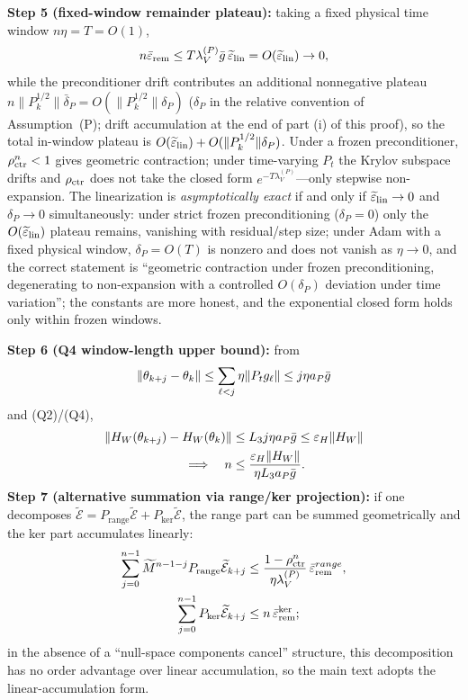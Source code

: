 \documentclass[11pt]{article}
\DeclarePairedDelimiter{\norm}{\lVert}{\rVert}
\newcommand{\W}{W}
\newcommand{\Erem}{\mathcal E}
\newcommand{\wt}[1]{\widetilde{#1}}
\numberwithin{equation}{section}
\begin{document}
\noindent\textbf{Step 5 (fixed-window remainder plateau):} taking a fixed physical time window $n\eta=T=O(1)$,
\begin{equation}
n\bar\varepsilon_{\rm rem}\le T\lambda_V^{(P)}\bar g\,\wt\varepsilon_{\rm lin}
=O(\wt\varepsilon_{\rm lin})\to0,
\end{equation}
while the preconditioner drift contributes an additional nonnegative plateau $n\|P_k^{1/2}\|\bar\delta_P=O(\|P_k^{1/2}\|\delta_P)$ ($\delta_P$ in the relative convention of Assumption~(P); drift accumulation at the end of part (i) of this proof), so the total in-window plateau is $O(\wt\varepsilon_{\rm lin})+O(\|P_k^{1/2}\|\delta_P)$. Under a frozen preconditioner, $\rho_{\rm ctr}^n<1$ gives geometric contraction; under time-varying $P_t$ the Krylov subspace drifts and $\rho_{\rm ctr}$ does not take the closed form $e^{-T\lambda_V^{(P)}}$---only stepwise non-expansion. The linearization is \emph{asymptotically exact} if and only if $\wt\varepsilon_{\rm lin}\to0$ and $\delta_P\to0$ simultaneously: under strict frozen preconditioning ($\delta_P=0$) only the $O(\wt\varepsilon_{\rm lin})$ plateau remains, vanishing with residual/step size; under Adam with a fixed physical window, $\delta_P=O(T)$ is nonzero and does not vanish as $\eta\to0$, and the correct statement is ``geometric contraction under frozen preconditioning, degenerating to non-expansion with a controlled $O(\delta_P)$ deviation under time variation''; the constants are more honest, and the exponential closed form holds only within frozen windows.

\noindent\textbf{Step 6 (Q4 window-length upper bound):} from
\begin{equation}
\norm{\theta_{k+j}-\theta_k}\le\sum_{\ell<j}\eta\norm{P_tg_\ell}\le j\eta a_P\bar g
\end{equation}
and (Q2)/(Q4),
\begin{align}
\norm{H_{\W}(\theta_{k+j})-H_{\W}(\theta_k)}
&\le L_3j\eta a_P\bar g\le\varepsilon_H\norm{H_{\W}}\notag\\
\Longrightarrow\quad
n&\le\frac{\varepsilon_H\norm{H_{\W}}}{\eta L_3a_P\bar g}.
\end{align}
\textbf{Step 7 (alternative summation via range/ker projection):} if one decomposes $\wt\Erem=P_{\operatorname{range}}\wt\Erem+P_{\ker}\wt\Erem$, the range part can be summed geometrically and the ker part accumulates linearly:
\begin{align}
\sum_{j=0}^{n-1}\wt M^{n-1-j}P_{\operatorname{range}}\wt\Erem_{k+j}
&\le\frac{1-\rho_{\rm ctr}^n}{\eta\lambda_V^{(P)}}\,\bar\varepsilon_{\rm rem}^{range},\\
\sum_{j=0}^{n-1}P_{\ker}\wt\Erem_{k+j}&\le n\,\bar\varepsilon_{\rm rem}^{\ker};
\end{align}
in the absence of a ``null-space components cancel'' structure, this decomposition has no order advantage over linear accumulation, so the main text adopts the linear-accumulation form.
\end{document}
